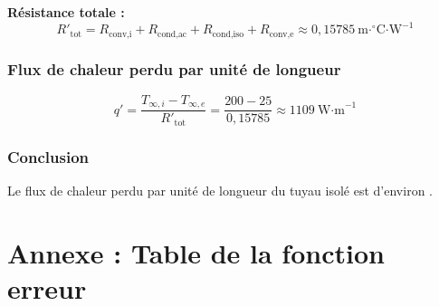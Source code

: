 \documentclass[12pt,a4paper]{article}
\begin{document}
\textbf{Résistance totale :}
\[
R'_{\text{tot}} = R_{\text{conv,i}} + R_{\text{cond,ac}} + R_{\text{cond,iso}} + R_{\text{conv,e}} \approx 0,15785\ \text{m·}^\circ\text{C·W}^{-1}
\]

\subsubsection*{Flux de chaleur perdu par unité de longueur}
\[
q' = \frac{T_{\infty,i} - T_{\infty,e}}{R'_{\text{tot}}} = \frac{200 - 25}{0,15785} \approx 1109\ \text{W·m}^{-1}
\]

\subsubsection*{Conclusion}
Le flux de chaleur perdu par unité de longueur du tuyau isolé est d'environ .

\newpage

\section*{Annexe : Table de la fonction erreur}
\end{document}
